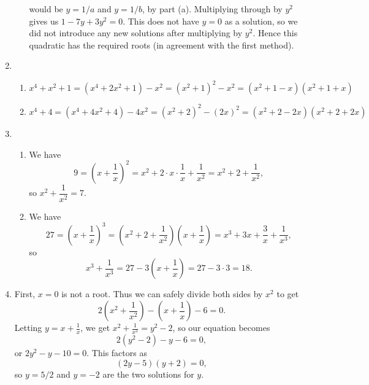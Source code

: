 \begin{enumerate}
\begin{enumerate}
\begin{equation*}
\end{equation*}
would be $y = 1/a$ and $y = 1/b$, by part (a). Multiplying through by $y^2$ gives us $1 - 7y + 3y^2 = 0$. This does not have $y = 0$ as a solution, so we did not introduce any new solutions after multiplying by $y^2$. Hence this quadratic has the required roots (in agreement with the first method).
\end{enumerate}
\item \begin{enumerate}
\item $x^4 + x^2 + 1 = (x^4 + 2x^2 + 1) - x^2 = (x^2 + 1)^2 - x^2 = \boxed{(x^2 + 1 - x)(x^2 + 1 + x)}$
\item $x^4 + 4 = (x^4 + 4x^2 + 4) - 4x^2 = (x^2 + 2)^2 - (2x)^2 = \boxed{(x^2 + 2 - 2x)(x^2 + 2 + 2x)}$
\end{enumerate}
\item \begin{enumerate}
\item We have
\begin{equation*}
9 = \left(x + \frac{1}{x}\right)^2 = x^2 + 2\cdot x\cdot\frac{1}{x} + \frac{1}{x^2} = x^2 + 2 + \frac{1}{x^2},
\end{equation*}
so $x^2 + \dfrac{1}{x^2} = \boxed{7}$.
\item We have
\begin{equation*}
27 = \left(x + \frac{1}{x}\right)^3 = \left(x^2 + 2 + \frac{1}{x^2}\right)\left(x + \frac{1}{x}\right) = x^3 + 3x + \frac{3}{x} + \frac{1}{x^3},
\end{equation*}
so 
\begin{equation*}
x^3 + \frac{1}{x^3} = 27 - 3\left(x + \frac{1}{x}\right) = 27 - 3\cdot 3 = \boxed{18}.
\end{equation*}
\end{enumerate}
\item First, $x = 0$ is not a root. Thus we can safely divide both sides by $x^2$ to get
\begin{equation*}
2\left(x^2 + \frac{1}{x^2}\right) - \left(x + \frac{1}{x}\right) - 6 = 0.
\end{equation*}
Letting $y = x + \frac{1}{x}$, we get $x^2 + \frac{1}{x^2} = y^2 - 2$, so our equation becomes
\begin{equation*}
2(y^2 - 2) - y - 6 = 0,
\end{equation*}
or $2y^2 - y - 10 = 0$. This factors as
\begin{equation*}
(2y - 5)(y + 2) = 0,
\end{equation*}
so $y = 5/2$ and $y = -2$ are the two solutions for $y$.\par 

\end{enumerate}

